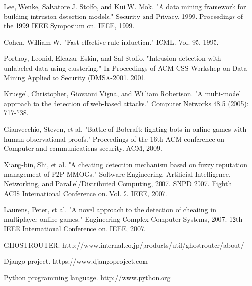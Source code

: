 \documentclass[a4paper,11pt]{jsarticle}
\begin{document}
\newpage
\begin{thebibliography}{99}

Lee, Wenke, Salvatore J. Stolfo, and Kui W. Mok. "A data mining framework for building intrusion detection models." Security and Privacy, 1999. Proceedings of the 1999 IEEE Symposium on. IEEE, 1999.

Cohen, William W. "Fast effective rule induction." ICML. Vol. 95. 1995.

Portnoy, Leonid, Eleazar Eskin, and Sal Stolfo. "Intrusion detection with unlabeled data using clustering." In Proceedings of ACM CSS Workshop on Data Mining Applied to Security (DMSA-2001. 2001.

Kruegel, Christopher, Giovanni Vigna, and William Robertson. "A multi-model approach to the detection of web-based attacks." Computer Networks 48.5 (2005): 717-738.

Gianvecchio, Steven, et al. "Battle of Botcraft: fighting bots in online games with human observational proofs." Proceedings of the 16th ACM conference on Computer and communications security. ACM, 2009.

Xiang-bin, Shi, et al. "A cheating detection mechanism based on fuzzy reputation management of P2P MMOGs." Software Engineering, Artificial Intelligence, Networking, and Parallel/Distributed Computing, 2007. SNPD 2007. Eighth ACIS International Conference on. Vol. 2. IEEE, 2007.

Laurens, Peter, et al. "A novel approach to the detection of cheating in multiplayer online games." Engineering Complex Computer Systems, 2007. 12th IEEE International Conference on. IEEE, 2007.

GHOSTROUTER. http://www.internal.co.jp/products/util/ghostrouter/about/

Django project. https://www.djangoproject.com

Python programming language. http://www.python.org

\end{thebibliography}

%
%
\end{document}
